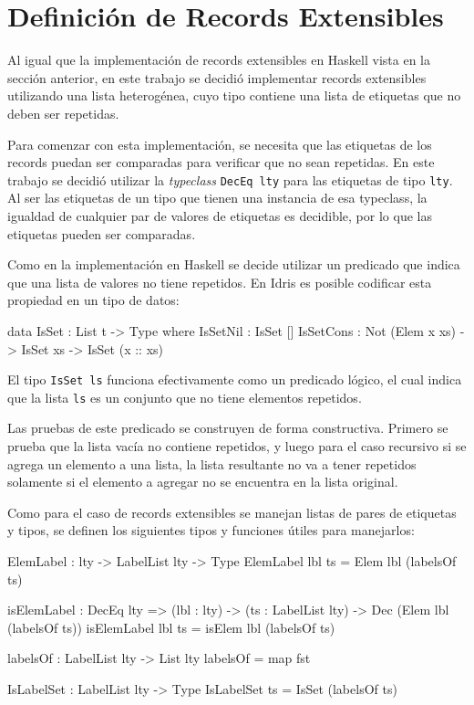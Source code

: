 \section{Definición de Records Extensibles}

Al igual que la implementación de records extensibles en Haskell vista en la sección anterior, en este trabajo se decidió implementar records extensibles utilizando una lista heterogénea, cuyo tipo contiene una lista de etiquetas que no deben ser repetidas.

Para comenzar con esta implementación, se necesita que las etiquetas de los records puedan ser comparadas para verificar que no sean repetidas. En este trabajo se decidió utilizar la \textit{typeclass} \texttt{DecEq lty} para las etiquetas de tipo \texttt{lty}. Al ser las etiquetas de un tipo que tienen una instancia de esa typeclass, la igualdad de cualquier par de valores de etiquetas es decidible, por lo que las etiquetas pueden ser comparadas.

Como en la implementación en Haskell se decide utilizar un predicado que indica que una lista de valores no tiene repetidos.
En Idris es posible codificar esta propiedad en un tipo de datos:

\begin{code}
data IsSet : List t -> Type where
  IsSetNil : IsSet []
  IsSetCons : Not (Elem x xs) -> IsSet xs -> IsSet (x :: xs)
\end{code}

El tipo \texttt{IsSet ls} funciona efectivamente como un predicado lógico, el cual indica que la lista \texttt{ls} es un conjunto que no tiene elementos repetidos.

Las pruebas de este predicado se construyen de forma constructiva. Primero se prueba que la lista vacía no contiene repetidos, y luego para el caso recursivo si se agrega un elemento a una lista, la lista resultante no va a tener repetidos solamente si el elemento a agregar no se encuentra en la lista original.

Como para el caso de records extensibles se manejan listas de pares de etiquetas y tipos, se definen los siguientes tipos y funciones útiles para manejarlos:

\begin{code}
ElemLabel : lty -> LabelList lty -> Type
ElemLabel lbl ts = Elem lbl (labelsOf ts)

isElemLabel : DecEq lty => (lbl : lty) -> (ts : LabelList lty) -> Dec (Elem lbl (labelsOf ts))
isElemLabel lbl ts = isElem lbl (labelsOf ts)

labelsOf : LabelList lty -> List lty
labelsOf = map fst

IsLabelSet : LabelList lty -> Type
IsLabelSet ts = IsSet (labelsOf ts)  
\end{code}

